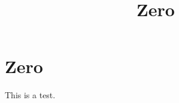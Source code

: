 \documentclass[11pt]{amsart}
\title{Zero}
\author{}
\date{}
\begin{document}
\maketitle
\section{Zero}

This is a test.
\end{document}
